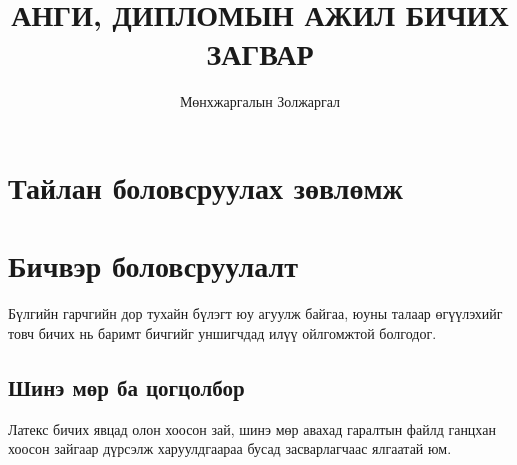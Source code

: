 \documentclass[12pt,A4]{report}
\begin{document}

\title{АНГИ, ДИПЛОМЫН АЖИЛ БИЧИХ ЗАГВАР}
\author{Мөнхжаргалын Золжаргал}







\chapter{Тайлан боловсруулах зөвлөмж}


\chapter{Бичвэр боловсруулалт}
Бүлгийн гарчгийн дор тухайн бүлэгт юу агуулж байгаа, юуны талаар өгүүлэхийг товч бичих нь баримт бичгийг уншигчдад илүү ойлгомжтой болгодог.
\section{Шинэ мөр ба цогцолбор}
Латекс бичих явцад олон хоосон зай, шинэ мөр авахад гаралтын файлд ганцхан хоосон зайгаар дүрсэлж харуулдгаараа бусад засварлагчаас ялгаатай юм. 
\end{document}
